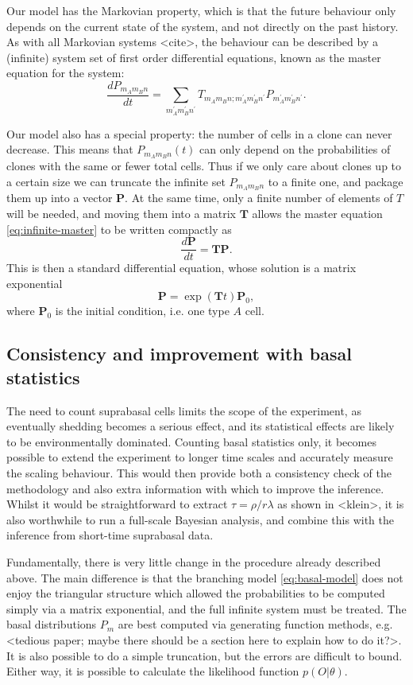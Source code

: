 \documentclass[10pt,UKenglish]{article}
\begin{document}
Our model has the Markovian property, which is that the future behaviour only depends on the current state of the system, and not directly on the past history. As with all Markovian systems <cite>, the behaviour can be described by a (infinite) system set of first order differential equations, known as the master equation for the system: 
\begin{equation}
\frac{dP_{m_A m_B n}}{dt} = \sum_{m_A^\prime m_B^\prime n^\prime} T_{m_A m_B n; m_A^\prime m_B^\prime n^\prime} P_{m_A^\prime m_B^\prime n^\prime}. \label{eq:infinite-master}
\end{equation}

Our model also has a special property: the number of cells in a clone can never decrease. This means that $P_{m_A m_B n}(t)$ can only depend on the probabilities of clones with the same or fewer total cells. Thus if we only care about clones up to a certain size we can truncate the infinite set $P_{m_A m_B n}$ to a finite one, and package them up into a vector $\mathbf P$. At the same time, only a finite number of elements of $T$ will be needed, and moving them into a matrix $\mathbf T$ allows the master equation \eqref{eq:infinite-master} to be written compactly as $$\frac{d\mathbf P}{dt} = \mathbf{T P}.$$ This is then a standard differential equation, whose solution is a matrix exponential $$\mathbf P = \exp(\mathbf T t) \mathbf P_0,$$ where $\mathbf P_0$ is the initial condition, i.e. one type $A$ cell.

\subsection{\label{sec:ball-plane}Consistency and improvement with basal statistics}

The need to count suprabasal cells limits the scope of the experiment, as eventually shedding becomes a serious effect, and its statistical effects are likely to be environmentally dominated. Counting basal statistics only, it becomes possible to extend the experiment to longer time scales and accurately measure the scaling behaviour. This would then provide both a consistency check of the methodology and also extra information with which to improve the inference. Whilst it would be straightforward to extract $\tau = \rho/r\lambda$ as shown in <klein>, it is also worthwhile to run a full-scale Bayesian analysis, and combine this with the inference from short-time suprabasal data.

Fundamentally, there is very little change in the procedure already described above. The main difference is that the branching model \ref{eq:basal-model} does not enjoy the triangular structure which allowed the probabilities to be computed simply via a matrix exponential, and the full infinite system must be treated. The basal distributions $P_m$ are best computed via generating function methods, e.g. <tedious paper; maybe there should be a section here to explain how to do it?>. It is also possible to do a simple truncation, but the errors are difficult to bound. Either way, it is possible to calculate the likelihood function $p(O|\theta)$.
\end{document}
